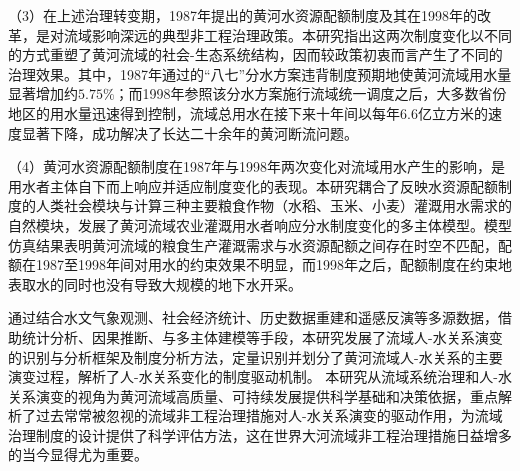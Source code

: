 \begin{cabstract}
（3）在上述治理转变期，1987年提出的黄河水资源配额制度及其在1998年的改革，是对流域影响深远的典型非工程治理政策。本研究指出这两次制度变化以不同的方式重塑了黄河流域的社会-生态系统结构，因而较政策初衷而言产生了不同的治理效果。其中，1987年通过的``八七''分水方案违背制度预期地使黄河流域用水量显著增加约$5.75\%$；而1998年参照该分水方案施行流域统一调度之后，大多数省份地区的用水量迅速得到控制，流域总用水在接下来十年间以每年6.6亿立方米的速度显著下降，成功解决了长达二十余年的黄河断流问题。

（4）黄河水资源配额制度在1987年与1998年两次变化对流域用水产生的影响，是用水者主体自下而上响应并适应制度变化的表现。本研究耦合了反映水资源配额制度的人类社会模块与计算三种主要粮食作物（水稻、玉米、小麦）灌溉用水需求的自然模块，发展了黄河流域农业灌溉用水者响应分水制度变化的多主体模型。模型仿真结果表明黄河流域的粮食生产灌溉需求与水资源配额之间存在时空不匹配，配额在1987至1998年间对用水的约束效果不明显，而1998年之后，配额制度在约束地表取水的同时也没有导致大规模的地下水开采。

通过结合水文气象观测、社会经济统计、历史数据重建和遥感反演等多源数据，借助统计分析、因果推断、与多主体建模等手段，本研究发展了流域人-水关系演变的识别与分析框架及制度分析方法，定量识别并划分了黄河流域人-水关系的主要演变过程，解析了人-水关系变化的制度驱动机制。
本研究从流域系统治理和人-水关系演变的视角为黄河流域高质量、可持续发展提供科学基础和决策依据，重点解析了过去常常被忽视的流域非工程治理措施对人-水关系演变的驱动作用，为流域治理制度的设计提供了科学评估方法，这在世界大河流域非工程治理措施日益增多的当今显得尤为重要。


\end{cabstract}



